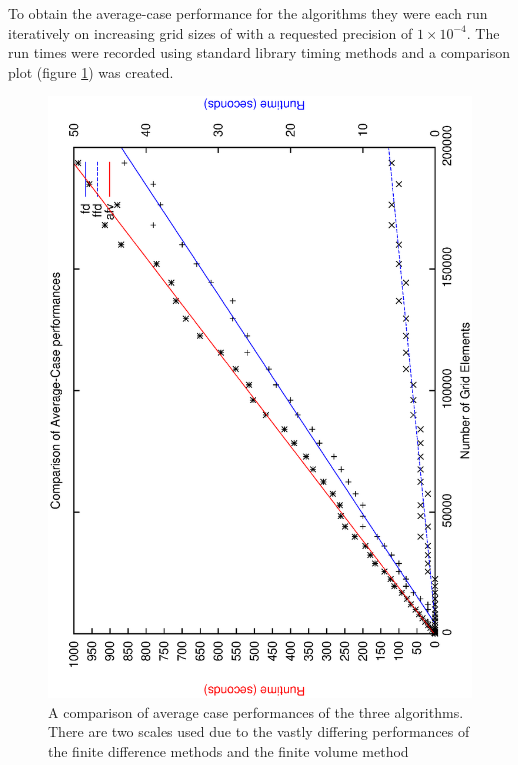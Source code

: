 \documentclass[aps,twocolumn,pre,nofootinbib,10pt]{revtex4-1}
\begin{document}
To obtain the average-case performance for the algorithms they were each run iteratively on increasing grid sizes of with a requested precision of $1 \times 10^{-4}$. The run times were recorded using standard library timing methods and a comparison plot (figure \ref{fig:acalgcomp}) was created.

\begin{figure}
    \caption{A comparison of average case performances of the three algorithms. There are two scales used due to the vastly differing performances of the finite difference methods and the finite volume method}
    \label{fig:acalgcomp}
    \begin{center}
        \includegraphics*[angle=-90,width=\columnwidth]{comparison_ac.ps}
    \end{center}
\end{figure}
\end{document}
